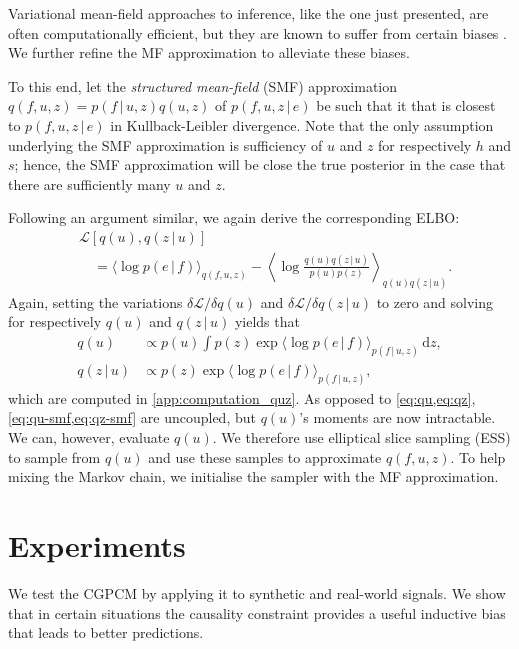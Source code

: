 \documentclass{article}
\newcommand{\id}[1]{\, \mathrm{d} #1}     %
\newcommand{\cond}{\, | \,}               %
\renewcommand{\ll}{\left}
\newcommand{\rr}{\right}
\newcommand{\la}{\langle}
\newcommand{\ra}{\rangle}
\begin{document}
Variational mean-field approaches to inference, like the one just presented, are often computationally efficient, but they are known to suffer from certain biases \cite{MacKay:2002:Information_Theory_Learning,Turner:2011:Two_Problems_With_Variational_Expectation,Murphy:2012:Probabilistic_Perspective}. We further refine the MF approximation to alleviate these biases.

To this end, let the \textit{structured mean-field} (SMF) approximation $q(f,u,z)=p(f\cond u, z)q(u,z)$ of $p(f,u,z\cond e)$ be such that it that is closest to $p(f,u,z\cond e)$ in Kullback-Leibler divergence. Note that the only assumption underlying the SMF approximation is sufficiency of $u$ and $z$ for respectively $h$ and $s$; hence, the SMF approximation will be close the true posterior in the case that there are sufficiently many $u$ and $z$.

Following an argument similar, we again derive the corresponding ELBO:
\begin{align*}
    &\mathcal{L}[q(u),q(z\cond u)] \\
    &\quad= \la \log p(e\cond f) \ra_{q(f,u,z)}- \ll\la\log\frac{q(u)q(z\cond u)}{p(u)p(z)}\rr\ra_{q(u)q(z\cond u)}.
\end{align*}
Again, setting the variations $\delta \mathcal{L} / \delta q(u)$ and $\delta \mathcal{L} / \delta q(z\cond u)$ to zero and solving for respectively $q(u)$ and $q(z\cond u)$ yields that
\begin{align}
    q(u) &\propto p(u) \int p(z) \exp\la\log p(e\cond f)\ra_{p(f\cond u, z)}\id{z}, \label{eq:qu-smf} \\
    q(z\cond u) &\propto p(z)\exp\la \log p(e\cond f)\ra_{p(f\cond u, z)}, \label{eq:qz-smf}
\end{align}
which are computed in \cref{app:computation_quz}.
As opposed to \cref{eq:qu,eq:qz}, \cref{eq:qu-smf,eq:qz-smf} are uncoupled, but $q(u)$'s moments are now intractable. We can, however, evaluate $q(u)$. We therefore use elliptical slice sampling (ESS) \cite{Murray:2010:Elliptical_Slice_Sampling} to sample from $q(u)$ and use these samples to approximate $q(f, u, z)$. To help mixing the Markov chain, we initialise the sampler with the MF approximation.

\section{Experiments}
We test the CGPCM by applying it to synthetic and real-world signals. We show that in certain situations the causality constraint provides a useful inductive bias that leads to better predictions.
\end{document}
